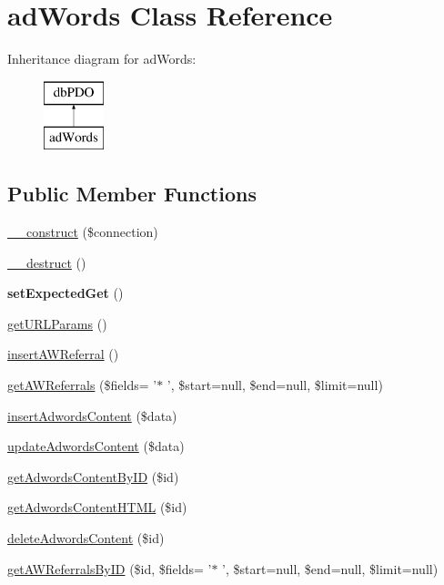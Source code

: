 \hypertarget{classad_words}{\section{ad\-Words Class Reference}
\label{classad_words}
}
Inheritance diagram for ad\-Words\-:\begin{figure}[H]
\begin{center}
\leavevmode
\includegraphics[height=2.000000cm]{classad_words}
\end{center}
\end{figure}
\subsection*{Public Member Functions}
\begin{DoxyCompactItemize}
\item 
\hyperlink{classad_words_a155afedbdfa01f1c0b813ca97642cdab}{\-\_\-\-\_\-construct} (\$connection)
\item 
\hyperlink{classad_words_a421831a265621325e1fdd19aace0c758}{\-\_\-\-\_\-destruct} ()
\item 
\hypertarget{classad_words_a9bf83ac28c970180dd0a19c947b228af}{{\bfseries set\-Expected\-Get} ()}\label{classad_words_a9bf83ac28c970180dd0a19c947b228af}

\item 
\hyperlink{classad_words_ab266e93fa2a60e1040af77722b108409}{get\-U\-R\-L\-Params} ()
\item 
\hyperlink{classad_words_a21aaab50551efd2135c7cba5bb2a1d3c}{insert\-A\-W\-Referral} ()
\item 
\hyperlink{classad_words_a83cfc1f27fa45ceae5b19ee48a7b69a4}{get\-A\-W\-Referrals} (\$fields= '$\ast$ ', \$start=null, \$end=null, \$limit=null)
\item 
\hyperlink{classad_words_afed5aecd2349d5c4c6f8b0ca0f8ac475}{insert\-Adwords\-Content} (\$data)
\item 
\hyperlink{classad_words_a9505e1b708f6f8b947af4aac60b6e15a}{update\-Adwords\-Content} (\$data)
\item 
\hyperlink{classad_words_a53116b77ed57dc81c0ce4f99102fd73e}{get\-Adwords\-Content\-By\-I\-D} (\$id)
\item 
\hyperlink{classad_words_a3049482d3f7c582b1f4b4f0bf3055029}{get\-Adwords\-Content\-H\-T\-M\-L} (\$id)
\item 
\hyperlink{classad_words_a4895a797b1ef94a475613aeec6ad18a0}{delete\-Adwords\-Content} (\$id)
\item 
\hyperlink{classad_words_a0bdc9669061797f51ced6bf2aaa8b8f2}{get\-A\-W\-Referrals\-By\-I\-D} (\$id, \$fields= '$\ast$ ', \$start=null, \$end=null, \$limit=null)
\end{DoxyCompactItemize}

